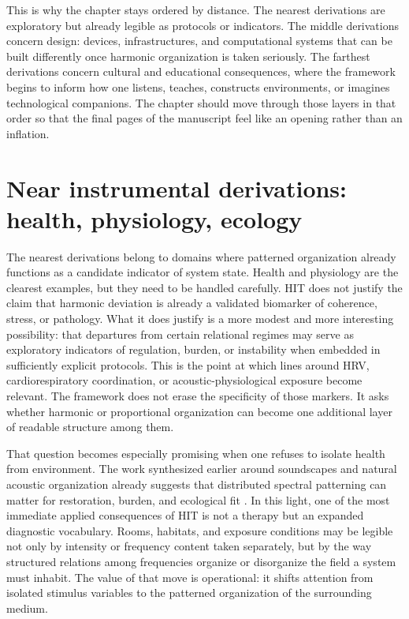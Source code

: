 This is why the chapter stays ordered by distance. The nearest derivations are exploratory but already legible as protocols or indicators. The middle derivations concern design: devices, infrastructures, and computational systems that can be built differently once harmonic organization is taken seriously. The farthest derivations concern cultural and educational consequences, where the framework begins to inform how one listens, teaches, constructs environments, or imagines technological companions. The chapter should move through those layers in that order so that the final pages of the manuscript feel like an opening rather than an inflation.


\section{Near instrumental derivations: health, physiology, ecology}


The nearest derivations belong to domains where patterned organization already functions as a candidate indicator of system state. Health and physiology are the clearest examples, but they need to be handled carefully. HIT does not justify the claim that harmonic deviation is already a validated biomarker of coherence, stress, or pathology. What it does justify is a more modest and more interesting possibility: that departures from certain relational regimes may serve as exploratory indicators of regulation, burden, or instability when embedded in sufficiently explicit protocols. This is the point at which lines around HRV, cardiorespiratory coordination, or acoustic-physiological exposure become relevant. The framework does not erase the specificity of those markers. It asks whether harmonic or proportional organization can become one additional layer of readable structure among them.

That question becomes especially promising when one refuses to isolate health from environment. The work synthesized earlier around soundscapes and natural acoustic organization already suggests that distributed spectral patterning can matter for restoration, burden, and ecological fit \parencite{buxton_2021,krause_2013}. In this light, one of the most immediate applied consequences of HIT is not a therapy but an expanded diagnostic vocabulary. Rooms, habitats, and exposure conditions may be legible not only by intensity or frequency content taken separately, but by the way structured relations among frequencies organize or disorganize the field a system must inhabit. The value of that move is operational: it shifts attention from isolated stimulus variables to the patterned organization of the surrounding medium.


